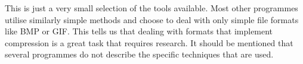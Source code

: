 This is just a very small selection of the tools available. Most other programmes utilise similarly simple methods and choose to deal with only simple file formats like BMP or GIF. This tells us that dealing with formats that implement compression is a great task that requires research. 
It should be mentioned that several programmes do not describe the specific techniques that are used.